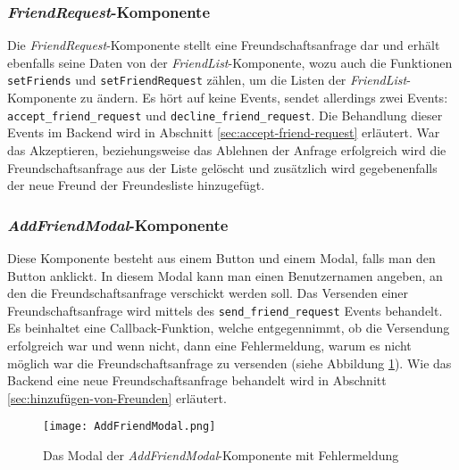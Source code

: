 \subsubsection{\textit{FriendRequest}-Komponente}
Die \textit{FriendRequest}-Komponente stellt eine Freundschaftsanfrage dar und erhält ebenfalls seine Daten von der \textit{FriendList}-Komponente, wozu auch die Funktionen \verb|setFriends| und \verb|setFriendRequest| zählen, um die Listen der \textit{FriendList}-Komponente zu ändern.
Es hört auf keine Events, sendet allerdings zwei Events: \verb|accept_friend_request| und \verb|decline_friend_request|. Die Behandlung dieser Events im Backend wird in Abschnitt \ref{sec:accept-friend-request} erläutert. War das Akzeptieren, beziehungsweise das Ablehnen der Anfrage erfolgreich wird die Freundschaftsanfrage aus der Liste gelöscht und zusätzlich wird gegebenenfalls der neue Freund der Freundesliste hinzugefügt.

\subsubsection{\textit{AddFriendModal}-Komponente}
Diese Komponente besteht aus einem Button und einem Modal, falls man den Button anklickt. In diesem Modal kann man einen Benutzernamen angeben, an den die Freundschaftsanfrage verschickt werden soll. Das Versenden einer Freundschaftsanfrage wird mittels des \verb|send_friend_request| Events behandelt. Es beinhaltet eine Callback-Funktion, welche entgegennimmt, ob die Versendung erfolgreich war und wenn nicht, dann eine Fehlermeldung, warum es nicht möglich war die Freundschaftsanfrage zu versenden (siehe Abbildung \ref{fig:AddFriendModal}). Wie das Backend eine neue Freundschaftsanfrage behandelt wird in Abschnitt \ref{sec:hinzufügen-von-Freunden} erläutert.

\begin{figure}[h]
\centering
\texttt{[image: AddFriendModal.png]}
\caption{Das Modal der \textit{AddFriendModal}-Komponente mit Fehlermeldung}
\label{fig:AddFriendModal}
\end{figure}

